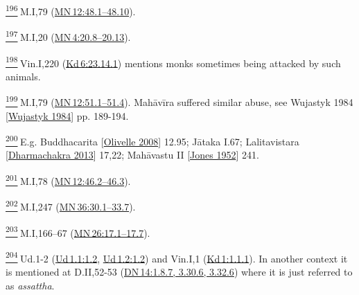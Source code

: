 \label{footprints_split_024.html_fn196}
\hyperref[footprints_split_009.htmlux5cux23fnref196]{\textsuperscript{196}} M.I,79
(\href{https://suttacentral.net/mn12/en/sujato\#48.1}{MN\,12:48.1--48.10}).

\label{footprints_split_024.html_fn197}
\hyperref[footprints_split_009.htmlux5cux23fnref197]{\textsuperscript{197}} M.I,20
(\href{https://suttacentral.net/mn4/en/sujato\#20.8}{MN\,4:20.8--20.13}).

\label{footprints_split_024.html_fn198}
\hyperref[footprints_split_009.htmlux5cux23fnref198]{\textsuperscript{198}} Vin.I,220
(\href{https://suttacentral.net/pli-tv-kd6/en/brahmali\#23.14.1}{Kd\,6:23.14.1})
mentions monks sometimes being attacked by such animals.

\label{footprints_split_024.html_fn199}
\hyperref[footprints_split_009.htmlux5cux23fnref199]{\textsuperscript{199}} M.I,79
(\href{https://suttacentral.net/mn12/en/sujato\#51.1}{MN\,12:51.1--51.4}).
Mahāvīra suffered similar abuse, see {Wujastyk 1984
{{[}\hyperref[footprints_split_022.htmlux5cux23Wujastykux5cux25201984]{Wujastyk
1984}{]}}} pp. 189-194.

\label{footprints_split_024.html_fn200}
\hyperref[footprints_split_009.htmlux5cux23fnref200]{\textsuperscript{200}} E.g.
{Buddhacarita
{{[}\hyperref[footprints_split_023.htmlux5cux23Olivelleux5cux25202008]{Olivelle
2008}{]}}} 12.95; Jātaka I.67; {Lalitavistara
{{[}\hyperref[footprints_split_023.htmlux5cux23Dharmachakraux5cux25202013]{Dharmachakra
2013}{]}}} 17,22; {Mahāvastu II
{{[}\hyperref[footprints_split_023.htmlux5cux23Jonesux5cux25201952]{Jones
1952}{]}}} 241.

\label{footprints_split_024.html_fn201}
\hyperref[footprints_split_009.htmlux5cux23fnref201]{\textsuperscript{201}} M.I,78
(\href{https://suttacentral.net/mn12/en/sujato\#46.2}{MN\,12:46.2--46.3}).

\label{footprints_split_024.html_fn202}
\hyperref[footprints_split_009.htmlux5cux23fnref202]{\textsuperscript{202}} M.I,247
(\href{https://suttacentral.net/mn36/en/sujato\#30.1}{MN\,36:30.1--33.7}).

\label{footprints_split_024.html_fn203}
\hyperref[footprints_split_009.htmlux5cux23fnref203]{\textsuperscript{203}} M.I,166--67
(\href{https://suttacentral.net/mn26/en/sujato\#17.1}{MN\,26:17.1--17.7}).

\label{footprints_split_024.html_fn204}
\hyperref[footprints_split_009.htmlux5cux23fnref204]{\textsuperscript{204}} Ud.1-2
(\href{https://suttacentral.net/ud1.1/en/sujato\#1.2}{Ud\,1.1:1.2},
\href{https://suttacentral.net/ud1.2/en/sujato\#1.2}{Ud\,1.2:1.2}) and
Vin.I,1
(\href{https://suttacentral.net/pli-tv-kd1/en/brahmali\#1.1.1}{Kd\,1:1.1.1}).
In another context it is mentioned at D.II,52-53
(\href{https://suttacentral.net/dn14/en/sujato\#1.8.7}{DN\,14:1.8.7,
3.30.6, 3.32.6}) where it is just referred to as \emph{assattha}.

